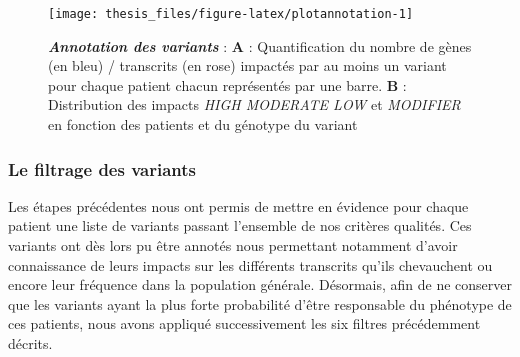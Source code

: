 \documentclass[12pt,twoside]{ugathesis}
\begin{document}
\newpage

\begin{figure}

{\centering \texttt{[image: thesis\_files/figure-latex/plotannotation-1]} 

}

\caption[Annotation des variants]{\textbf{\emph{Annotation des variants}} :
\textbf{A} : Quantification du nombre de gènes (en bleu) / transcrits
(en rose) impactés par au moins un variant pour chaque patient chacun
représentés par une barre. \textbf{B} : Distribution des impacts
\emph{HIGH MODERATE LOW} et \emph{MODIFIER} en fonction des patients et
du génotype du variant}\label{fig:plotannotation}
\end{figure}








\subsubsection{Le filtrage des
variants}\label{le-filtrage-des-variants-1}

Les étapes précédentes nous ont permis de mettre en évidence pour chaque
patient une liste de variants passant l'ensemble de nos critères
qualités. Ces variants ont dès lors pu être annotés nous permettant
notamment d'avoir connaissance de leurs impacts sur les différents
transcrits qu'ils chevauchent ou encore leur fréquence dans la
population générale. Désormais, afin de ne conserver que les variants
ayant la plus forte probabilité d'être responsable du phénotype de ces
patients, nous avons appliqué successivement les six filtres
précédemment décrits.
\end{document}
